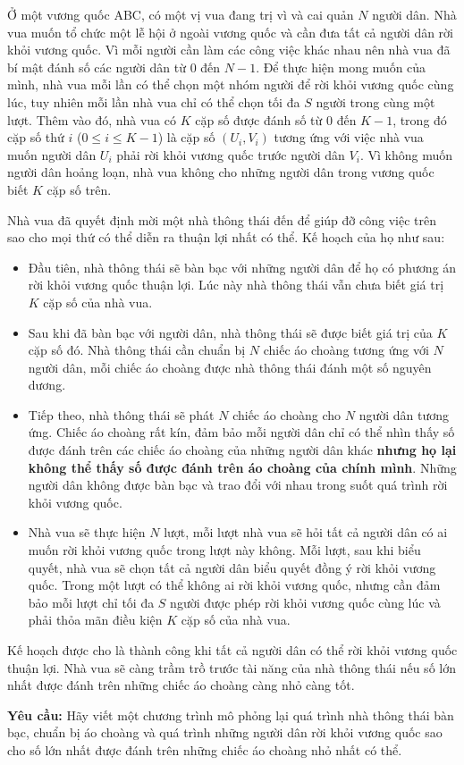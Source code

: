 Ở một vương quốc ABC, có một vị vua đang trị vì và cai quản $N$ người dân. Nhà vua muốn tổ chức một lễ hội ở ngoài vương quốc và cần đưa tất cả người dân rời khỏi vương quốc. Vì mỗi người cần làm các công việc khác nhau nên nhà vua đã bí mật đánh số các người dân từ $0$ đến $N-1$. Để thực hiện mong muốn của mình, nhà vua mỗi lần có thể chọn một nhóm người để rời khỏi vương quốc cùng lúc, tuy nhiên mỗi lần nhà vua chỉ có thể chọn tối đa $S$ người trong cùng một lượt. Thêm vào đó, nhà vua có $K$ cặp số được đánh số từ $0$ đến $K-1$, trong đó cặp số thứ $i$ ($0\le i\le K-1$) là cặp số $(U_i,V_i)$ tương ứng với việc nhà vua muốn người dân $U_i$ phải rời khỏi vương quốc trước người dân $V_i$. Vì không muốn người dân hoảng loạn, nhà vua không cho những người dân trong vương quốc biết $K$ cặp số trên.

Nhà vua đã quyết định mời một nhà thông thái đến để giúp đỡ công việc trên sao cho mọi thứ có thể diễn ra thuận lợi nhất có thể. Kế hoạch của họ như sau:
\begin{itemize}
   \item Đầu tiên, nhà thông thái sẽ bàn bạc với những người dân để họ có phương án rời khỏi vương quốc thuận lợi. Lúc này nhà thông thái vẫn chưa biết giá trị $K$ cặp số của nhà vua.
   \item Sau khi đã bàn bạc với người dân, nhà thông thái sẽ được biết giá trị của $K$ cặp số đó. Nhà thông thái cần chuẩn bị $N$ chiếc áo choàng tương ứng với $N$ người dân, mỗi chiếc áo choàng được nhà thông thái đánh một số nguyên dương.
   \item Tiếp theo, nhà thông thái sẽ phát $N$ chiếc áo choàng cho $N$ người dân tương ứng. Chiếc áo choàng rất kín, đảm bảo mỗi người dân chỉ có thể nhìn thấy số được đánh trên các chiếc áo choàng của những người dân khác \textbf{nhưng họ lại không thể thấy số được đánh trên áo choàng của chính mình}. Những người dân không được bàn bạc và trao đổi với nhau trong suốt quá trình rời khỏi vương quốc.
   \item Nhà vua sẽ thực hiện $N$ lượt, mỗi lượt nhà vua sẽ hỏi tất cả người dân có ai muốn rời khỏi vương quốc trong lượt này không. Mỗi lượt, sau khi biểu quyết, nhà vua sẽ chọn tất cả người dân biểu quyết đồng ý rời khỏi vương quốc. Trong một lượt có thể không ai rời khỏi vương quốc, nhưng cần đảm bảo mỗi lượt chỉ tối đa $S$ người được phép rời khỏi vương quốc cùng lúc và phải thỏa mãn điều kiện $K$ cặp số của nhà vua.
\end{itemize}

Kế hoạch được cho là thành công khi tất cả người dân có thể rời khỏi vương quốc thuận lợi. Nhà vua sẽ càng trầm trồ trước tài năng của nhà thông thái nếu số lớn nhất được đánh trên những chiếc áo choàng càng nhỏ càng tốt.

\textbf{Yêu cầu:} Hãy viết một chương trình mô phỏng lại quá trình nhà thông thái bàn bạc, chuẩn bị áo choàng và quá trình những người dân rời khỏi vương quốc sao cho số lớn nhất được đánh trên những chiếc áo choàng nhỏ nhất có thể.